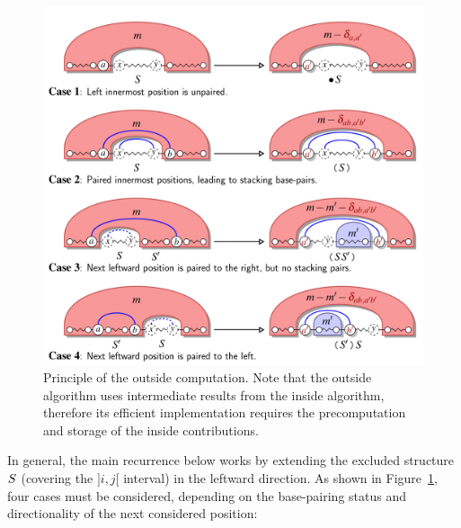 \begin{figure}[t]\centering
\includegraphics[scale=\ScaleDP]{FigDPOutsideWrapper}
\caption{Principle of the outside computation. Note that the outside algorithm uses intermediate results from the inside algorithm, 
therefore its efficient implementation requires the precomputation and storage of the inside contributions.\label{fig:outside}}
\end{figure}
In general, the main recurrence below works by extending the excluded structure $S$ (covering the $]i,j[$ interval) in the leftward direction. As shown in Figure~\ref{fig:outside}, four cases must be considered, depending on the base-pairing status and directionality of the next considered position:

